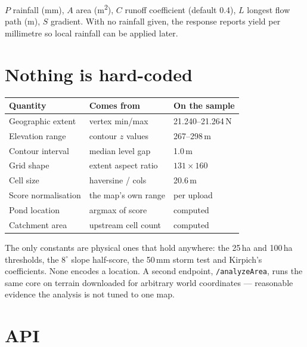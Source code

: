 \documentclass[11pt,a4paper]{article}
\begin{document}
$P$ rainfall (mm), $A$ area (m\textsuperscript{2}), $C$ runoff coefficient
(default 0.4), $L$ longest flow path (m), $S$ gradient. With no rainfall given,
the response reports yield per millimetre so local rainfall can be applied later.

\section{Nothing is hard-coded}
\label{sec:general}

\begin{table}[H]
\centering\small
\begin{tabular}{@{}p{}p{}p{}@{}}
\toprule
\textbf{Quantity} & \textbf{Comes from} & \textbf{On the sample} \\
\midrule
Geographic extent   & vertex min/max      & 21.240--21.264\,N \\
Elevation range     & contour $z$ values  & 267--298\,m \\
Contour interval    & median level gap    & 1.0\,m \\
Grid shape          & extent aspect ratio & $131 \times 160$ \\
Cell size           & haversine / cols    & 20.6\,m \\
Score normalisation & the map's own range & per upload \\
Pond location       & argmax of score     & computed \\
Catchment area      & upstream cell count & computed \\
\bottomrule
\end{tabular}
\end{table}

The only constants are physical ones that hold anywhere: the 25\,ha and 100\,ha
thresholds, the $8^{\circ}$ slope half-score, the 50\,mm storm test and
Kirpich's coefficients. None encodes a location. A second endpoint,
\texttt{/analyzeArea}, runs the same core on terrain downloaded for arbitrary
world coordinates --- reasonable evidence the analysis is not tuned to one map.

\section{API}
\label{sec:api}
\end{document}
